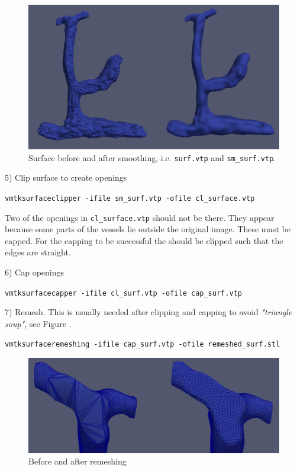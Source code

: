 \documentclass[epsfig,11pt]{article}
\begin{document}
\begin{figure}[h!] 
\begin{center}
  \includegraphics[scale=0.3]{smoothing.png}
  \end{center}
  \caption{Surface before and after smoothing, i.e. \texttt{surf.vtp} and \texttt{sm\_surf.vtp}.}
\end{figure}

5) Clip surface to create openings
\begin{framed}       
    \texttt{vmtksurfaceclipper -ifile sm\_surf.vtp -ofile cl\_surface.vtp}
\end{framed}

Two of the openings in \texttt{cl\_surface.vtp} should not be there. They appear because some parts of the vessels lie outside the original image. These must be capped. For the capping to be successful the should be clipped such that the edges are straight.

6) Cap openings 
\begin{framed}    
\texttt{vmtksurfacecapper -ifile cl\_surf.vtp -ofile cap\_surf.vtp}
\end{framed}
7) Remesh. This is usually needed after clipping and capping to avoid \emph{"triangle soup"}, see Figure 	. 
\begin{framed}    
\texttt{vmtksurfaceremeshing -ifile cap\_surf.vtp -ofile remeshed\_surf.stl}
\end{framed}

\begin{figure}[h!] 
\begin{center}
  \includegraphics[scale=0.3]{remsh.png}
  \end{center}
  \caption{Before and after remeshing}
\end{figure}
\end{document}

